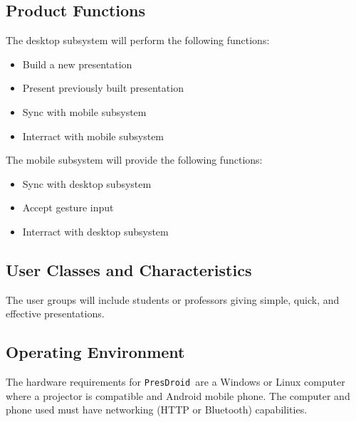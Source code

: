 \documentclass{article}
\newcommand{\pd}{\texttt{PresDroid }}
\begin{document}
\subsection{Product Functions}
The desktop subsystem will perform the following functions:
\begin{itemize}
\item Build a new presentation
\item Present previously built presentation
\item Sync with mobile subsystem
\item Interract with mobile subsystem
\end{itemize}

The mobile subsystem will provide the following functions:
\begin{itemize}
\item Sync with desktop subsystem
\item Accept gesture input
\item Interract with desktop subsystem
\end{itemize}

\subsection{User Classes and Characteristics}
The user groups will include students or professors giving simple, quick, and effective presentations.

\subsection{Operating Environment}
The hardware requirements for \pd are a Windows or Linux computer where a projector is compatible and Android mobile phone.
The computer and phone used must have networking (HTTP or Bluetooth) capabilities.
\end{document}
